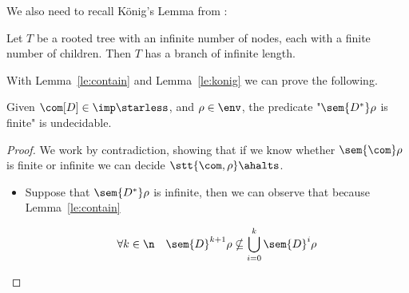 We also need to recall König's Lemma from \cite{konig1926lemma}:

\begin{lemma}\label{le:konig}
  Let \(T\) be a rooted tree with an infinite number of nodes,
  each with a finite number of children.  Then \(T\) has a branch
  of infinite length.
\end{lemma}

With Lemma~\ref{le:contain} and Lemma~\ref{le:konig} we can prove the
following.

\begin{lemma}\label{le:infiniteness}
  Given \(\com[D]\in\imp\starless\), and \(\rho \in \env\), the
  predicate "\(\sem{D^*}\rho\) is finite" is undecidable.
\end{lemma}

\begin{proof}
  We work by contradiction, showing that if we know whether
  \(\sem{\com}\rho\) is finite or infinite we can decide
  \(\stt{\com, \rho}\ahalts\).
  \begin{itemize}
  \item Suppose that \(\sem{D^*}\rho\) is infinite, then we can
    observe that because Lemma~\ref{le:contain}

    \begin{equation}\label{eq:noncontain}
      \forall k \in \n \quad \sem{D}^{k+1}\rho \nsubseteq \bigcup_{i=0}^k\sem{D}^i\rho
    \end{equation}


\end{itemize}
\end{proof}
